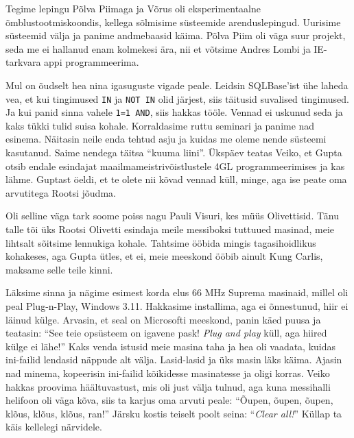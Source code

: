 Tegime lepingu Põlva Piimaga ja Võrus oli 
eksperimentaalne õmblustootmiskoondis, kellega sõlmisime süsteemide 
arenduslepingud. Uurisime süsteemid välja ja panime andmebaasid käima. Põlva 
Piim oli väga suur projekt, seda me ei hallanud enam kolmekesi ära, nii et võtsime 
Andres Lombi ja IE-tarkvara appi 
programmeerima. 

Mul on õudselt hea nina igasuguste vigade peale. Leidsin SQLBase'ist ühe laheda vea, et kui tingimused
\verb|IN| ja \verb|NOT IN| olid järjest, siis täitusid suvalised 
tingimused. Ja kui panid sinna vahele \verb|1=1 AND|, siis hakkas tööle. 
Vennad ei uskunud seda ja kaks tükki tulid suisa kohale. Korraldasime ruttu seminari ja panime nad esinema. Näitasin neile enda tehtud asju ja kuidas me oleme nende 
süsteemi kasutanud. Saime nendega täitsa \enquote{kuuma liini}. Ükspäev teatas Veiko, et 
Gupta otsib endale esindajat 
maailmameistrivõistlustele 4GL programmeerimises ja kas lähme. Guptast öeldi, et te 
olete nii kõvad vennad küll, minge, aga ise peate oma arvutitega Rootsi jõudma. 

Oli selline väga tark soome poiss nagu Pauli Visuri, kes müüs Olivettisid. Tänu talle tõi
üks Rootsi Olivetti esindaja meile messiboksi tuttuued masinad, meie 
lihtsalt sõitsime lennukiga kohale. Tahtsime ööbida mingis tagasihoidlikus 
kohakeses, aga Gupta ütles, et ei, meie meeskond ööbib ainult Kung 
Carlis, maksame selle teile kinni. 

Läksime sinna ja nägime esimest korda elus 66 MHz Suprema masinaid, millel oli peal Plug-n-Play, Windows 3.11. Hakkasime installima, aga ei õnnestunud, hiir ei läinud külge. Arvasin, 
et seal on Microsofti meeskond, panin käed puusa ja teatasin: 
\enquote{See teie opsüsteem on igavene pask! \emph{Plug and play} küll, aga hiired külge ei 
lähe!} Kaks venda istusid meie masina taha ja hea oli vaadata, kuidas 
ini-failid lendasid näppude alt 
välja. Lasid-lasid ja üks masin läks käima. Ajasin nad minema, 
kopeerisin ini-failid kõikidesse masinatesse ja oligi korras. Veiko hakkas 
proovima häältuvastust, mis oli just välja tulnud, aga kuna messihalli helifoon oli 
väga kõva, siis ta karjus oma arvuti peale: \enquote{Õupen, õupen, õupen, 
klõus, klõus, klõus, ran!} Järsku kostis teiselt poolt seina: 
\enquote{\emph{Clear all!}} Küllap ta käis kellelegi närvidele. 

